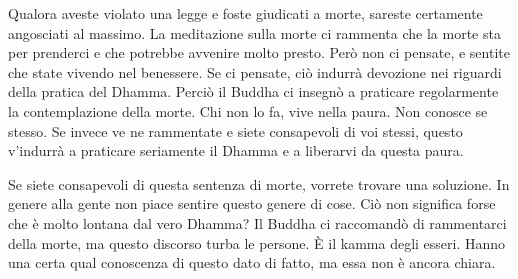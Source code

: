 Qualora aveste violato una legge e foste giudicati a morte, sareste
certamente angosciati al massimo. La meditazione sulla morte ci rammenta
che la morte sta per prenderci e che potrebbe avvenire molto presto.
Però non ci pensate, e sentite che state vivendo nel benessere. Se ci
pensate, ciò indurrà devozione nei riguardi della pratica del Dhamma.
Perciò il Buddha ci insegnò a praticare regolarmente la contemplazione
della morte. Chi non lo fa, vive nella paura. Non conosce se stesso. Se
invece ve ne rammentate e siete consapevoli di voi stessi, questo
v'indurrà a praticare seriamente il Dhamma e a liberarvi da questa
paura.

Se siete consapevoli di questa sentenza di morte, vorrete trovare una
soluzione. In genere alla gente non piace sentire questo genere di cose.
Ciò non significa forse che è molto lontana dal vero Dhamma? Il Buddha
ci raccomandò di rammentarci della morte, ma questo discorso turba le
persone. È il kamma degli esseri. Hanno una certa qual conoscenza
di questo dato di fatto, ma essa non è ancora chiara.

